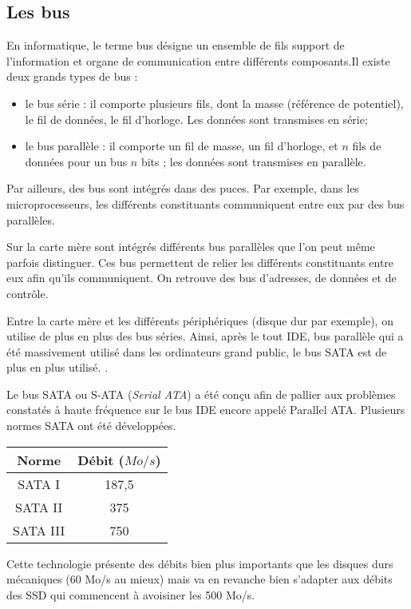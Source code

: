 \subsection{Les bus}

En informatique, le terme bus désigne un ensemble de fils support de l'information et organe de communication entre différents composants.Il existe deux grands types de bus :
\begin{itemize}
\item le bus série : il comporte plusieurs fils, dont la masse (référence de potentiel), le fil de données, le fil d'horloge. Les données sont transmises en série;
\item le bus parallèle : il comporte un fil de masse, un fil d'horloge, et $n$ fils de données pour un bus $n$ bits ; les données sont transmises en parallèle.
\end{itemize}

Par ailleurs, des bus sont intégrés dans des puces. Par exemple, dans les microprocesseurs, les différents constituants communiquent entre eux par des bus parallèles.
	
Sur la carte mère sont intégrés différents bus parallèles que l'on peut même parfois distinguer. Ces bus permettent de relier les différents constituants entre eux afin qu'ils communiquent. On retrouve des bus d'adresses, de données et de contrôle.

Entre la carte mère et les différents périphériques (disque dur par exemple), on utilise de plus en plus des bus séries. Ainsi, après le tout IDE, bus parallèle qui a été massivement utilisé dans les ordinateurs grand public, le bus SATA est de plus en plus utilisé. .

Le bus SATA ou S-ATA (\textit{Serial ATA}) a été conçu afin de pallier aux problèmes constatés à haute fréquence sur le bus IDE encore appelé Parallel ATA.
Plusieurs normes SATA ont été développées. 

\begin{center}
\begin{tabular}{|c|c|}
\hline
Norme & Débit ($Mo/s$) \\
\hline
SATA I & 187,5 \\ \hline
SATA II & 375 \\ \hline
SATA III & 750 \\ \hline
\end{tabular}
\end{center}

Cette technologie présente des débits bien plus importants que les disques durs mécaniques  (60 Mo/s au mieux) mais va en revanche bien s'adapter aux débits des SSD qui commencent à avoisiner les 500 Mo/s.


